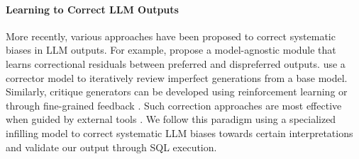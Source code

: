 \paragraph{Learning to Correct LLM Outputs} More recently, various approaches have been proposed to correct systematic biases in LLM outputs. For example, \citet{ji2024alignerefficientalignmentlearning} propose a model-agnostic module that learns correctional residuals between preferred and dispreferred outputs. \citet{welleck2023generating} use a corrector model to iteratively review imperfect generations from a base model. 
Similarly,  critique generators can be developed using reinforcement learning  \cite{wadhwa-etal-2024-learning-refine}  or through fine-grained feedback \cite{wadhwa-etal-2024-learning}. Such correction approaches are most effective when guided by external tools \citep{kamoi-etal-2024-llms}. We follow this paradigm using a specialized infilling model to correct systematic  LLM biases towards certain interpretations and validate our output through SQL execution.